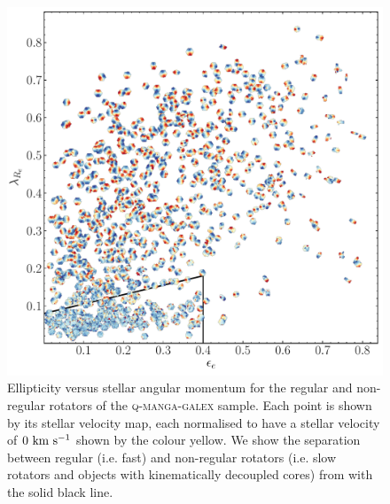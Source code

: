 \documentclass[useAMS,usenatbib]{mn2e}
\begin{document}
\begin{figure}
\centering
\includegraphics[width=\textwidth]{../figures/NSF_orig_cmap_vel_maps_large_nonkdc_VOR10_noalpha.pdf}
\caption{Ellipticity versus stellar angular momentum for the regular and non-regular rotators of the \textsc{q-manga-galex} sample. Each point is shown by its stellar velocity map, each normalised to have a stellar velocity of $0~\rm{km}~\rm{s}^{-1}$ shown by the colour yellow. We show the separation between regular (i.e. fast) and non-regular rotators (i.e. slow rotators and objects with kinematically decoupled cores) from \protect\cite{cappellari16} with the solid black line.}
\label{fig:evsl}
\end{figure}  
\end{document}
